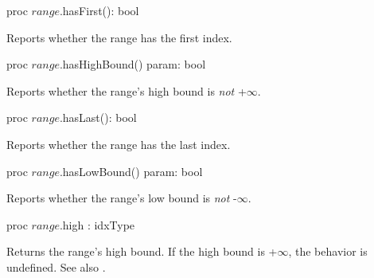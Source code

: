 \begin{protohead}
proc $range$.hasFirst(): bool
\end{protohead}
\begin{protobody}
Reports whether the range has the first index.
\end{protobody}

\begin{protohead}
proc $range$.hasHighBound() param: bool
\end{protohead}
\begin{protobody}
Reports whether the range's high bound is \emph{not} +$\infty$.
\end{protobody}

\begin{protohead}
proc $range$.hasLast(): bool
\end{protohead}
\begin{protobody}
Reports whether the range has the last index.
\end{protobody}

\begin{protohead}
proc $range$.hasLowBound() param: bool
\end{protohead}
\begin{protobody}
Reports whether the range's low bound is \emph{not} -$\infty$.
\end{protobody}

\begin{protohead}
proc $range$.high : idxType
\end{protohead}
\begin{protobody}
Returns the range's high bound.
If the high bound is +$\infty$, the behavior is undefined.
See also .
\end{protobody}


